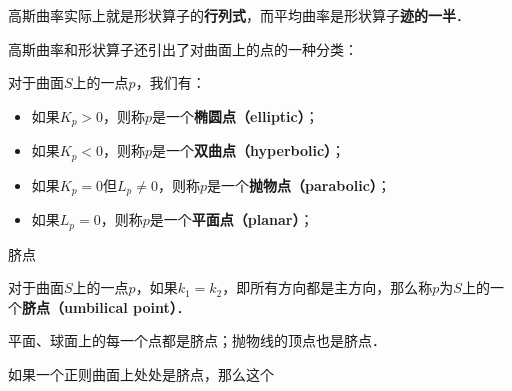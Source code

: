高斯曲率实际上就是形状算子的\textbf{行列式}，而平均曲率是形状算子\textbf{迹的一半}．

高斯曲率和形状算子还引出了对曲面上的点的一种分类：

\begin{definition}{}
对于曲面$S$上的一点$p$，我们有：
\begin{itemize}
\item 如果$K_p>0$，则称$p$是一个\textbf{椭圆点（elliptic）}；
\item 如果$K_p<0$，则称$p$是一个\textbf{双曲点（hyperbolic）}；
\item 如果$K_p=0$但$L_p\not=0$，则称$p$是一个\textbf{抛物点（parabolic）}；
\item 如果$L_p=0$，则称$p$是一个\textbf{平面点（planar）}；
\end{itemize}
\end{definition}


\begin{definition}{脐点}

对于曲面$S$上的一点$p$，如果$k_1=k_2$，即所有方向都是主方向，那么称$p$为$S$上的一个\textbf{脐点（umbilical point）}．

\end{definition}

平面、球面上的每一个点都是脐点；抛物线的顶点也是脐点．

\begin{theorem}{}
如果一个正则曲面上处处是脐点，那么这个
\end{theorem}



